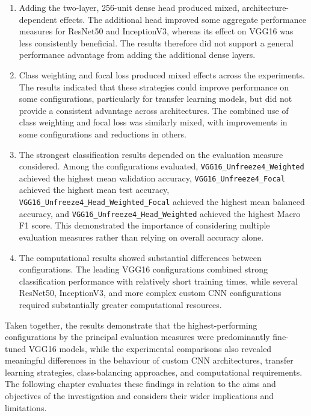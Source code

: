 \documentclass[12pt, a4paper]{report}
\begin{document}
\begin{enumerate}
				\item Adding the two-layer, 256-unit dense head produced mixed, architecture-dependent effects. The additional head improved some aggregate performance measures for ResNet50 and InceptionV3, whereas its effect on VGG16 was less consistently beneficial. The results therefore did not support a general performance advantage from adding the additional dense layers.\\
				\item Class weighting and focal loss produced mixed effects across the experiments. The results indicated that these strategies could improve performance on some configurations, particularly for transfer learning models, but did not provide a consistent advantage across architectures. The combined use of class weighting and focal loss was similarly mixed, with improvements in some configurations and reductions in others.\\
				\item The strongest classification results depended on the evaluation measure considered. Among the configurations evaluated, \texttt{VGG16\_Unfreeze4\_Weighted} achieved the highest mean validation accuracy, \texttt{VGG16\_Unfreeze4\_Focal} \\achieved the highest mean test accuracy, \\\texttt{VGG16\_Unfreeze4\_Head\_Weighted\_Focal} achieved the highest mean balanced accuracy, and \texttt{VGG16\_Unfreeze4\_Head\_Weighted} achieved the highest Macro F1 score. This demonstrated the importance of considering multiple evaluation measures rather than relying on overall accuracy alone.\\
				\item The computational results showed substantial differences between configurations. The leading VGG16 configurations combined strong classification performance with relatively short training times, while several ResNet50, InceptionV3, and more complex custom CNN configurations required substantially greater computational resources.
			\end{enumerate}
			Taken together, the results demonstrate that the highest-performing configurations by the principal evaluation measures were predominantly fine-tuned VGG16 models, while the experimental comparisons also revealed meaningful differences in the behaviour of custom CNN architectures, transfer learning strategies, class-balancing approaches, and computational requirements. The following chapter evaluates these findings in relation to the aims and objectives of the investigation and considers their wider implications and limitations.
	
\end{document}
